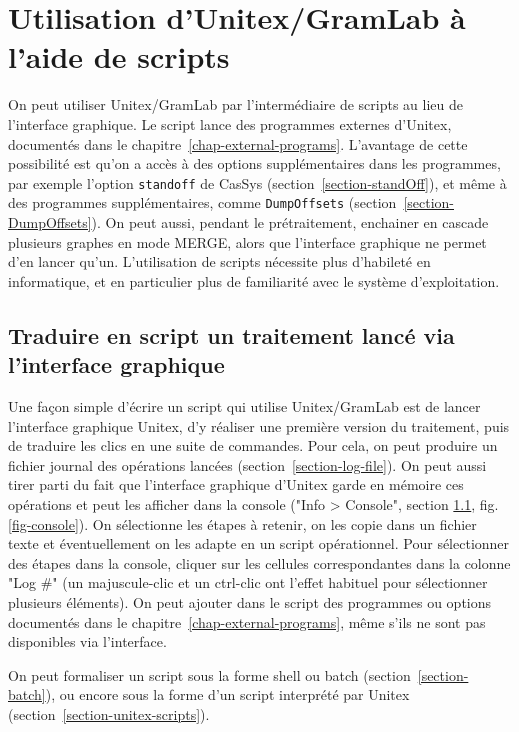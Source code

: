 \chapter{Utilisation d'Unitex/GramLab à l'aide de scripts}
\label{chap-scripts}

On peut utiliser Unitex/GramLab par l'intermédiaire de scripts au lieu de l'interface graphique.
Le script lance des programmes externes d'Unitex, documentés dans le
chapitre~\ref{chap-external-programs}. L'avantage de cette possibilité est qu'on a accès à des options
supplémentaires dans les programmes, par exemple l'option \verb$standoff$ de CasSys
(section~\ref{section-standOff}), et même à des programmes supplémentaires, comme
\verb$DumpOffsets$ (section~\ref{section-DumpOffsets}). On peut aussi, pendant le prétraitement,
enchainer en cascade plusieurs graphes en mode MERGE, alors que l'interface graphique ne permet d'en
lancer qu'un.
L'utilisation de scripts nécessite plus d'habileté en informatique, et en particulier plus de familiarité
avec le système d'exploitation.



\section{Traduire en script un traitement lancé via l'interface graphique}
\label{section-console}

Une façon simple d'écrire un script qui utilise Unitex/GramLab est de lancer l'interface graphique Unitex,
d'y réaliser une première version du traitement, puis de traduire les clics en une suite de commandes.
Pour cela, on peut produire un fichier journal des opérations lancées (section~\ref{section-log-file}).
On peut aussi tirer parti du fait que l'interface graphique d'Unitex garde en mémoire ces opérations
et peut les afficher dans la
console ("Info > Console", section \ref{section-console}, fig. \ref{fig-console}). On sélectionne les étapes
à retenir, on les copie dans un fichier texte et éventuellement on les adapte en un script opérationnel.
Pour sélectionner des étapes dans la console, cliquer sur les cellules correspondantes dans la colonne
"Log \#" (un majuscule-clic et un ctrl-clic ont l'effet habituel pour sélectionner plusieurs éléments).
On peut ajouter dans le script des programmes ou options documentés dans le
chapitre~\ref{chap-external-programs}, même s'ils ne sont pas disponibles via l'interface.

\bigskip
\noindent On peut formaliser un script sous la forme shell ou batch (section~\ref{section-batch}),
ou encore sous la forme d'un script interprété par Unitex (section~\ref{section-unitex-scripts}).




